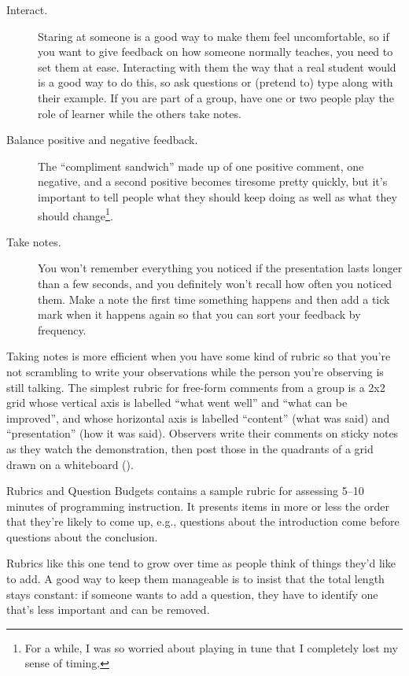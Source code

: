 \begin{description}

\item[Interact.]
  Staring at someone is a good way to make them feel uncomfortable,
  so if you want to give feedback on how someone normally teaches,
  you need to set them at ease.
  Interacting with them the way that a real student would is a good way to do this,
  so ask questions or (pretend to) type along with their example.
  If you are part of a group,
  have one or two people play the role of learner
  while the others take notes.

\item[Balance positive and negative feedback.]
  The ``compliment sandwich'' made up of one positive comment,
  one negative,
  and a second positive
  becomes tiresome pretty quickly,
  but it's important to tell people what they should keep doing
  as well as what they should change\footnote{
    For a while,
    I was so worried about playing in tune that I completely lost my sense of timing.
  }.

\item[Take notes.]
  You won't remember everything you noticed
  if the presentation lasts longer than a few seconds,
  and you definitely won't recall how often you noticed them.
  Make a note the first time something happens
  and then add a tick mark when it happens again
  so that you can sort your feedback by frequency.

\end{description}

Taking notes is more efficient when you have some kind of rubric
so that you're not scrambling to write your observations
while the person you're observing is still talking.
The simplest rubric for free-form comments from a group
is a 2x2 grid whose vertical axis is labelled ``what went well'' and ``what can be improved'',
and whose horizontal axis is labelled ``content'' (what was said)
and ``presentation'' (how it was said).
Observers write their comments on sticky notes as they watch the demonstration,
then post those in the quadrants of a grid drawn on a whiteboard
().


\begin{aside}{Rubrics and Question Budgets}
   contains a sample rubric
  for assessing 5--10 minutes of programming instruction.
  It presents items in more or less the order that they're likely to come up,
  e.g.,
  questions about the introduction come before questions about the conclusion.

  Rubrics like this one
  tend to grow over time as people think of things they'd like to add.
  A good way to keep them manageable is to insist that
  the total length stays constant:
  if someone wants to add a question,
  they have to identify one that's less important and can be removed.
\end{aside}

